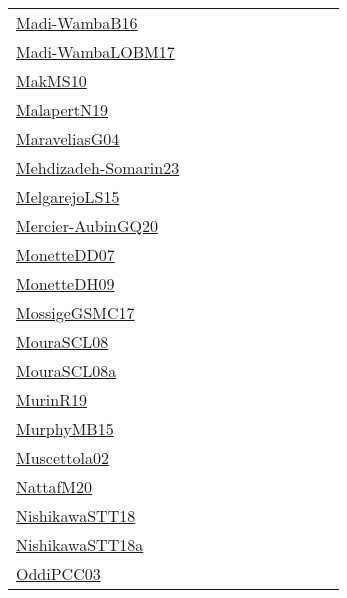 {\begin{longtable}{p{3cm}p{4cm}p{2cm}p{2cm}p{2cm}p{2cm}p{2cm}p{2cm}p{2cm}p{2cm}}
\href{papers/Madi-WambaB16.pdf}{Madi-WambaB16}~\cite{Madi-WambaB16} &  &  &  &  &  &  &  &  & \\
\href{papers/Madi-WambaLOBM17.pdf}{Madi-WambaLOBM17}~\cite{Madi-WambaLOBM17} &  &  &  &  &  &  &  &  & \\
\href{papers/MakMS10.pdf}{MakMS10}~\cite{MakMS10} &  &  &  &  &  &  &  &  & \\
\href{papers/MalapertN19.pdf}{MalapertN19}~\cite{MalapertN19} &  &  &  &  &  &  &  &  & \\
\href{papers/MaraveliasG04.pdf}{MaraveliasG04}~\cite{MaraveliasG04} &  &  &  &  &  &  &  &  & \\
\href{papers/Mehdizadeh-Somarin23.pdf}{Mehdizadeh-Somarin23}~\cite{Mehdizadeh-Somarin23} &  &  &  &  &  &  &  &  & \\
\href{papers/MelgarejoLS15.pdf}{MelgarejoLS15}~\cite{MelgarejoLS15} &  &  &  &  &  &  &  &  & \\
\href{papers/Mercier-AubinGQ20.pdf}{Mercier-AubinGQ20}~\cite{Mercier-AubinGQ20} &  &  &  &  &  &  &  &  & \\
\href{papers/MonetteDD07.pdf}{MonetteDD07}~\cite{MonetteDD07} &  &  &  &  &  &  &  &  & \\
\href{papers/MonetteDH09.pdf}{MonetteDH09}~\cite{MonetteDH09} &  &  &  &  &  &  &  &  & \\
\href{papers/MossigeGSMC17.pdf}{MossigeGSMC17}~\cite{MossigeGSMC17} &  &  &  &  &  &  &  &  & \\
\href{papers/MouraSCL08.pdf}{MouraSCL08}~\cite{MouraSCL08} &  &  &  &  &  &  &  &  & \\
\href{papers/MouraSCL08a.pdf}{MouraSCL08a}~\cite{MouraSCL08a} &  &  &  &  &  &  &  &  & \\
\href{papers/MurinR19.pdf}{MurinR19}~\cite{MurinR19} &  &  &  &  &  &  &  &  & \\
\href{papers/MurphyMB15.pdf}{MurphyMB15}~\cite{MurphyMB15} &  &  &  &  &  &  &  &  & \\
\href{papers/Muscettola02.pdf}{Muscettola02}~\cite{Muscettola02} &  &  &  &  &  &  &  &  & \\
\href{papers/NattafM20.pdf}{NattafM20}~\cite{NattafM20} &  &  &  &  &  &  &  &  & \\
\href{papers/NishikawaSTT18.pdf}{NishikawaSTT18}~\cite{NishikawaSTT18} &  &  &  &  &  &  &  &  & \\
\href{papers/NishikawaSTT18a.pdf}{NishikawaSTT18a}~\cite{NishikawaSTT18a} &  &  &  &  &  &  &  &  & \\
\href{papers/OddiPCC03.pdf}{OddiPCC03}~\cite{OddiPCC03} &  &  &  &  &  &  &  &  & \\

\end{longtable}}
